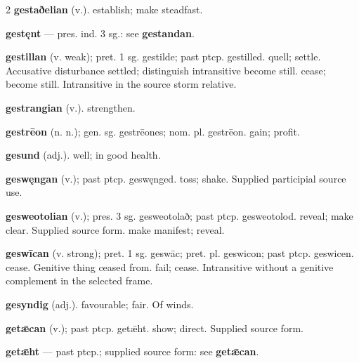 \begin{multicols*}{2}
\textbf{gestaðelian} (v.). establish; make steadfast.\par
\textbf{gestęnt} — pres. ind. 3 sg.: see \textbf{gestandan}.\par
\textbf{gestillan} (v. weak); pret. 1 sg. gestilde; past ptcp. gestilled. quell; settle. Accusative disturbance settled; distinguish intransitive become still. cease; become still. Intransitive in the source storm relative.\par
\textbf{gestrangian} (v.). strengthen.\par
\textbf{gestrēon} (n. n.); gen. sg. gestrēones; nom. pl. gestrēon. gain; profit.\par
\textbf{gesund} (adj.). well; in good health.\par
\textbf{geswęngan} (v.); past ptcp. geswęnged. toss; shake. Supplied participial source use.\par
\textbf{gesweotolian} (v.); pres. 3 sg. gesweotolað; past ptcp. gesweotolod. reveal; make clear. Supplied source form. make manifest; reveal.\par
\textbf{geswīcan} (v. strong); pret. 1 sg. geswāc; pret. pl. geswicon; past ptcp. geswicen. cease. Genitive thing ceased from. fail; cease. Intransitive without a genitive complement in the selected frame.\par
\textbf{gesyndig} (adj.). favourable; fair. Of winds.\par
\textbf{getǣcan} (v.); past ptcp. getǣht. show; direct. Supplied source form.\par
\textbf{getǣht} — past ptcp.; supplied source form: see \textbf{getǣcan}.\par

\end{multicols*}

